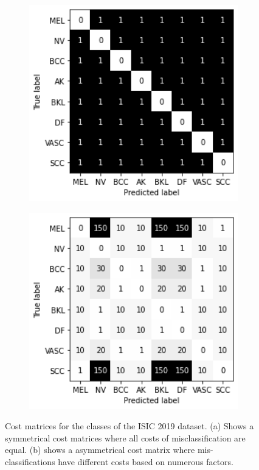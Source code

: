 \begin{figure}[!h]
	\centering
	\begin{subfigure}{0.49\textwidth}
		\centering
		\includegraphics[width=1\textwidth]{images/cost_matrix_1.png}
		\caption{}
		\label{fig:multiclasssymcosts}
	\end{subfigure}
	\begin{subfigure}{0.49\textwidth}
		\centering
		\includegraphics[width=1\textwidth]{images/cost_matrix_2.png}
		\caption{}
		\label{fig:multiclassasymcosts}
	\end{subfigure}
	\caption{Cost matrices for the classes of the ISIC 2019 dataset. (a) Shows a symmetrical cost matrices where all costs of misclassification are equal. (b) shows a asymmetrical cost matrix where mis-classifications have different costs based on numerous factors.}
	\label{fig:multiclasscosts}
\end{figure}

